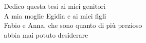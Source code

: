 \thispagestyle{empty}
{}

\vspace*{3cm}
\begin{center}
    Dedico questa tesi ai miei genitori \\ \medskip
    A mia moglie Egidia e ai miei figli \\ \medskip
    Fabio e Anna, che sono quanto di più prezioso \\ \medskip
    abbia mai potuto desiderare \\ \medskip
\end{center}